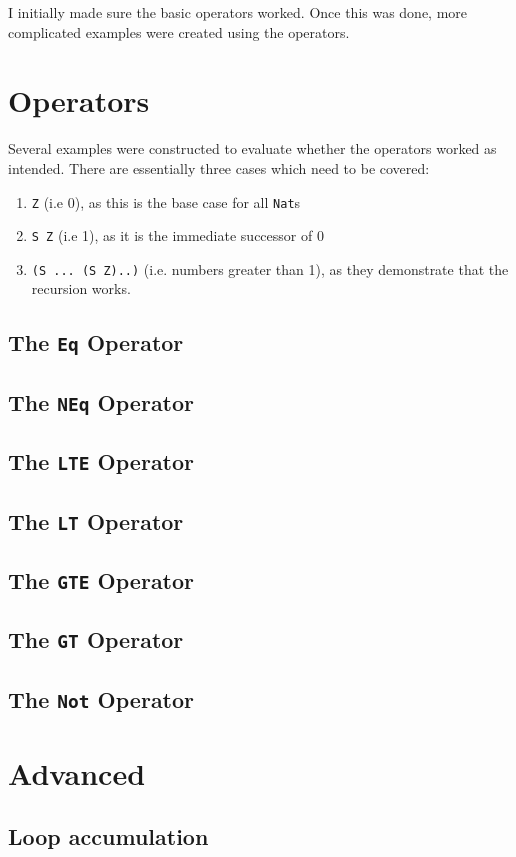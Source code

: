 I initially made sure the basic operators worked. Once this was done, more
complicated examples were created using the operators.
\section{Operators}
	Several examples were constructed to evaluate whether the operators worked
	as intended. There are essentially three cases which need to be covered:
	\begin{enumerate}
		\item \texttt{Z} (i.e 0), as this is the base case for all \texttt{Nat}s
		\item \texttt{S Z} (i.e 1), as it is the immediate successor of 0
		\item \texttt{(S ... (S Z)..)} (i.e. numbers greater than 1), as they
			  demonstrate that the recursion works.
	\end{enumerate}
    \subsection{The \texttt{Eq} Operator}
    
    \subsection{The \texttt{NEq} Operator}
    
    \subsection{The \texttt{LTE} Operator}
    
    \subsection{The \texttt{LT} Operator}
    
    \subsection{The \texttt{GTE} Operator}
    
    \subsection{The \texttt{GT} Operator}
    
    \subsection{The \texttt{Not} Operator}

\section{Advanced}
    \subsection{Loop accumulation}
